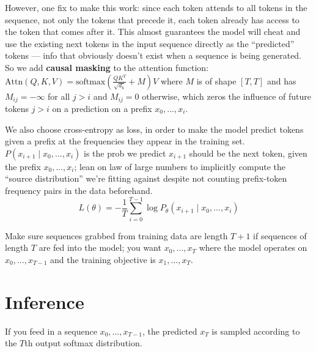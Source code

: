 \documentclass[12pt]{article}
\begin{document}
\begin{outline}
However, one fix to make this work: since each token attends to all tokens in the sequence, not only the tokens that precede it, each token already has access to the token that comes after it. This almost guarantees the model will cheat and use the existing next tokens in the input sequence directly as the ``predicted'' tokens --- info that obviously doesn't exist when a sequence is being generated.
\1 So we add \textbf{causal masking} to the attention function: $\boxed{\text{Attn}(Q,K,V)=\text{softmax}\left(\frac{QK^T}{\sqrt{d_k}}+M\right)V}$ where $M$ is of shape $[T,T]$ and has $M_{ij}=-\infty$ for all $j>i$ and $M_{ij}=0$ otherwise, which zeros the influence of future tokens $j>i$ on a prediction on a prefix $x_0,...,x_i$.
\\\0

We also choose cross-entropy as loss, in order to make the model predict tokens given a prefix at the frequencies they appear in the training set. $P(x_{i+1} \mid x_0,...,x_i)$ is the prob we predict $x_{i+1}$ should be the next token, given the prefix $x_0,...,x_i$; lean on law of large numbers to implicitly compute the ``source distribution'' we're fitting against despite not counting prefix-token frequency pairs in the data beforehand.
\[ \boxed{L(\theta) = -\frac 1T \sum_{i=0}^{T-1} \log P_\theta(x_{i+1} \mid x_0,...,x_i)} \]

Make sure sequences grabbed from training data are length $T+1$ if sequences of length $T$ are fed into the model; you want $x_0,...,x_T$ where the model operates on $x_0,...,x_{T-1}$ and the training objective is $x_1,...,x_T$.

\section{Inference}

If you feed in a sequence $x_0,...,x_{T-1}$, the predicted $x_T$ is sampled according to the $T$th output softmax distribution.

\end{outline}
\end{document}
